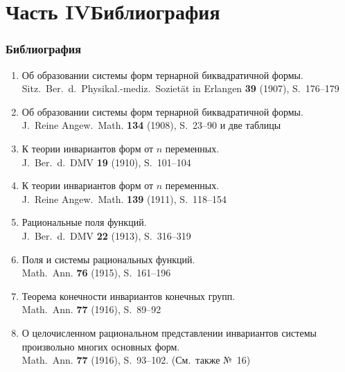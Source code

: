 \documentclass[11pt]{article}
\newcommand{\foreign}[1]{#1}
\begin{document}
\part*{Часть IV\hspace{1em}Библиография}

\section*{Библиография}

\begin{enumerate}[label={\small\arabic*.},leftmargin=2em,itemsep=0.3em]
\item Об образовании системы форм тернарной биквадратичной формы.\\
\foreign{Sitz.\ Ber.\ d.\ Physikal.-mediz.\ Sozietät in Erlangen} \textbf{39} (1907), S.~176--179

\item Об образовании системы форм тернарной биквадратичной формы.\\
\foreign{J.\ Reine Angew.\ Math.} \textbf{134} (1908), S.~23--90 и две таблицы

\item К теории инвариантов форм от $n$ переменных.\\
\foreign{J.\ Ber.\ d.\ DMV} \textbf{19} (1910), S.~101--104

\item К теории инвариантов форм от $n$ переменных.\\
\foreign{J.\ Reine Angew.\ Math.} \textbf{139} (1911), S.~118--154

\item Рациональные поля функций.\\
\foreign{J.\ Ber.\ d.\ DMV} \textbf{22} (1913), S.~316--319

\item Поля и системы рациональных функций.\\
\foreign{Math.\ Ann.} \textbf{76} (1915), S.~161--196

\item Теорема конечности инвариантов конечных групп.\\
\foreign{Math.\ Ann.} \textbf{77} (1916), S.~89--92

\item О целочисленном рациональном представлении инвариантов системы произвольно многих основных форм.\\
\foreign{Math.\ Ann.} \textbf{77} (1916), S.~93--102. (См.\ также №~16)


\end{enumerate}
\end{document}
